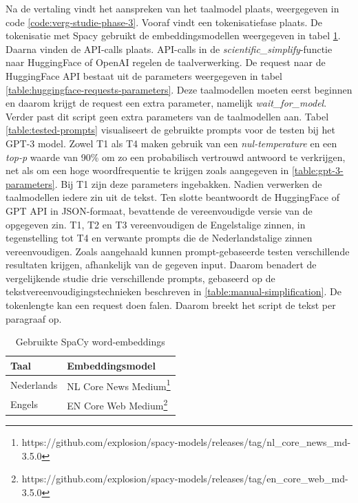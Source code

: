 Na de vertaling vindt het aanspreken van het taalmodel plaats, weergegeven in code \ref{code:verg-studie-phase-3}. Vooraf vindt een tokenisatiefase plaats. De tokenisatie met Spacy gebruikt de embeddingsmodellen weergegeven in tabel \ref{table:wordembeddings-spacy}. Daarna vinden de API-calls plaats. API-calls in de \textit{scientific\_simplify}-functie naar HuggingFace of OpenAI regelen de taalverwerking. De request naar de HuggingFace API bestaat uit de parameters weergegeven in tabel \ref{table:huggingface-requests-parameters}. Deze taalmodellen moeten eerst beginnen en daarom krijgt de request een extra parameter, namelijk \textit{wait\_for\_model}. Verder past dit script geen extra parameters van de taalmodellen aan. Tabel \ref{table:tested-prompts} visualiseert de gebruikte prompts voor de testen bij het GPT-3 model. Zowel T1 als T4 maken gebruik van een \textit{nul-temperature} en een \textit{top-p} waarde van 90\% om zo een probabilisch vertrouwd antwoord te verkrijgen, net als om een hoge woordfrequentie te krijgen zoals aangegeven in \ref{table:gpt-3-parameters}. Bij T1 zijn deze parameters ingebakken. Nadien verwerken de taalmodellen iedere zin uit de tekst. Ten slotte beantwoordt de HuggingFace of GPT API in JSON-formaat, bevattende de vereenvoudigde versie van de opgegeven zin. T1, T2 en T3 vereenvoudigen de Engelstalige zinnen, in tegenstelling tot T4 en verwante prompts die de Nederlandstalige zinnen vereenvoudigen. Zoals aangehaald kunnen prompt-gebaseerde testen verschillende resultaten krijgen, afhankelijk van de gegeven input. Daarom benadert de vergelijkende studie drie verschillende prompts, gebaseerd op de tekstvereenvoudigingstechnieken beschreven in \ref{table:manual-simplification}. De tokenlengte kan een request doen falen. Daarom breekt het script de tekst per paragraaf op. 


\begin{center}
	\begin{table}[H]
		\begin{tabular}{ | m{4cm} | m{12cm} | } 
			\hline
			\textbf{Taal} & \textbf{Embeddingsmodel} \\
			\hline
			Nederlands & NL Core News Medium\footnote{https://github.com/explosion/spacy-models/releases/tag/nl\_core\_news\_md-3.5.0} \\ 
			\hline
			Engels & EN Core Web Medium\footnote{https://github.com/explosion/spacy-models/releases/tag/en\_core\_web\_md-3.5.0} \\
			\hline
		\end{tabular}
		\caption{Gebruikte SpaCy word-embeddings}
		\label{table:wordembeddings-spacy}
	\end{table}
\end{center}

